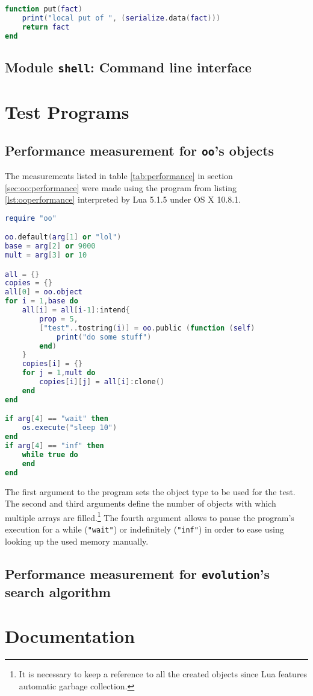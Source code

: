 \begin{appendices}
\begin{lstlisting}[language=lua, caption={The module \texttt{onsite}}, label=lst:onsite, name=lst:onsite]
function put(fact)
	print("local put of ", (serialize.data(fact)))
	return fact
end
\end{lstlisting}

\section{Module \texttt{shell}: Command line interface}

\chapter{Test Programs}

\section{Performance measurement for \texttt{oo}'s objects}
\label{sec:app:ooperformance}

The measurements listed in table \ref{tab:performance} in section \ref{sec:oo:performance} were made using the program from listing \ref{lst:ooperformance} interpreted by Lua 5.1.5 under OS X 10.8.1. 

\begin{lstlisting}[language=lua, caption={Test program for memory measurement of different object types}, label=lst:ooperformance, name=lst:ooperformance]
require "oo"

oo.default(arg[1] or "lol")
base = arg[2] or 9000
mult = arg[3] or 10

all = {}
copies = {}
all[0] = oo.object
for i = 1,base do
	all[i] = all[i-1]:intend{
		prop = 5,
		["test"..tostring(i)] = oo.public (function (self)
			print("do some stuff")
		end)
	}
	copies[i] = {}
	for j = 1,mult do
		copies[i][j] = all[i]:clone()
	end
end

if arg[4] == "wait" then
	os.execute("sleep 10")
end
if arg[4] == "inf" then
	while true do
	end
end
\end{lstlisting}
	
The first argument to the program sets the object type to be used for the test. The second and third arguments define the number of objects with which multiple arrays are filled.\footnote{It is necessary to keep a reference to all the created objects since Lua features automatic garbage collection.} The fourth argument allows to pause the program's execution for a while (\texttt{"wait"}) or indefinitely (\texttt{"inf"}) in order to ease using looking up the used memory manually.

\section{Performance measurement for \texttt{evolution}'s search algorithm}


\chapter{Documentation}

\end{appendices}